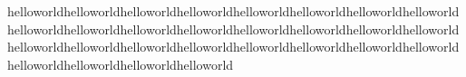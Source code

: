 \documentclass{article}
\begin{document}
helloworldhelloworldhelloworldhelloworldhelloworldhelloworldhelloworldhelloworldhelloworldhelloworldhelloworldhelloworldhelloworldhelloworldhelloworldhelloworldhelloworldhelloworldhelloworldhelloworldhelloworldhelloworldhelloworldhelloworldhelloworldhelloworldhelloworldhelloworld
\end{document}
